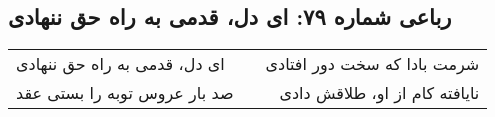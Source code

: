 \begin{center}
\section*{رباعی شماره ۷۹: ای دل، قدمی به راه حق ننهادی}
\label{sec:079}
\begin{longtable}{l p{0.5cm} r}
ای دل، قدمی به راه حق ننهادی
&&
شرمت بادا که سخت دور افتادی
\\
صد بار عروس توبه را بستی عقد
&&
نایافته کام از او، طلاقش دادی
\\
\end{longtable}
\end{center}
